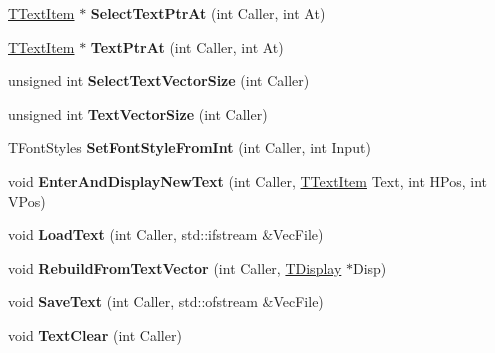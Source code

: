 \begin{DoxyCompactItemize}
\mbox{\hyperlink{class_t_text_item}{T\+Text\+Item}} $\ast$ {\bfseries Select\+Text\+Ptr\+At} (int Caller, int At)
\item 
\mbox{\label{class_t_text_handler_ac478536f458d9cda8a841953672f6525}} 
\mbox{\hyperlink{class_t_text_item}{T\+Text\+Item}} $\ast$ {\bfseries Text\+Ptr\+At} (int Caller, int At)
\item 
\mbox{\label{class_t_text_handler_a48c65d591fcb76f0a8e86c7f734849b2}} 
unsigned int {\bfseries Select\+Text\+Vector\+Size} (int Caller)
\item 
\mbox{\label{class_t_text_handler_a7dfd4e30235878fb01e7387715e0cb0f}} 
unsigned int {\bfseries Text\+Vector\+Size} (int Caller)
\item 
\mbox{\label{class_t_text_handler_a11c7049a10f03f7bd56e6b32eb23b766}} 
T\+Font\+Styles {\bfseries Set\+Font\+Style\+From\+Int} (int Caller, int Input)
\item 
\mbox{\label{class_t_text_handler_a49b9ef44166e8768b231fd4beea8c0da}} 
void {\bfseries Enter\+And\+Display\+New\+Text} (int Caller, \mbox{\hyperlink{class_t_text_item}{T\+Text\+Item}} Text, int H\+Pos, int V\+Pos)
\item 
\mbox{\label{class_t_text_handler_ab67bb7278c89557bf9cc8bef475afab5}} 
void {\bfseries Load\+Text} (int Caller, std\+::ifstream \&Vec\+File)
\item 
\mbox{\label{class_t_text_handler_a30f32d9d3267bc8c90298e0ecd3c26fd}} 
void {\bfseries Rebuild\+From\+Text\+Vector} (int Caller, \mbox{\hyperlink{class_t_display}{T\+Display}} $\ast$Disp)
\item 
\mbox{\label{class_t_text_handler_a07441155bee467c9fb111b8332681466}} 
void {\bfseries Save\+Text} (int Caller, std\+::ofstream \&Vec\+File)
\item 
\mbox{\label{class_t_text_handler_ae50027851479dd0f362a75abad793e7a}} 
void {\bfseries Text\+Clear} (int Caller)
\item 
\mbox{\label{class_t_text_handler_ad8129c58cfa1ecad2fc343efdb96eb5e}} 

\end{DoxyCompactItemize}
